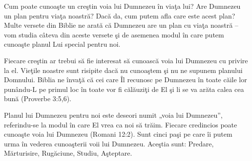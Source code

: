\newpage


Cum poate cunoaşte un creştin voia lui Dumnezeu în viaţa lui? Are Dumnezeu un plan pentru viaţa noastră? Dacă da, cum putem afla care este acest plan? Multe versete din Biblie ne arată că Dumnezeu are un plan cu viaţa noastră – vom studia câteva din aceste versete şi de asemenea modul în care putem cunoaşte planul Lui special pentru noi.

Fiecare creştin ar trebui să fie interesat să cunoască voia lui Dumnezeu cu privire la el. Vieţile noastre sunt risipite dacă nu cunoaştem şi nu ne supunem planului Domnului. Biblia ne învaţă că cei care Îl recunosc pe Dumnezeu în toate căile lor punându-L pe primul loc în toate vor fi călăuziţi de El şi li se va arăta calea cea bună (Proverbe 3:5,6).

Planul lui Dumnezeu pentru noi este deseori numit „voia lui Dumnezeu”, referindu-se la modul în care El vrea ca noi să trăim. Fiecare credincios poate cunoaşte voia lui Dumnezeu (Romani 12:2). Sunt cinci paşi pe care îi putem urma în vederea cunoaşterii voii lui Dumnezeu. Aceştia sunt: Predare, Mărturisire, Rugăciune, Studiu, Aşteptare.

